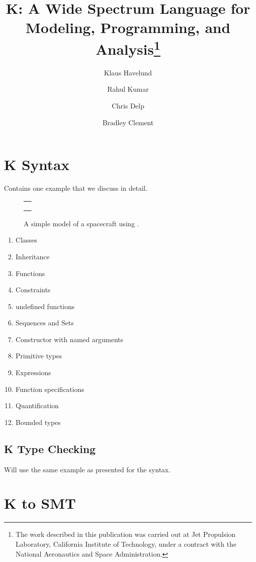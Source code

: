 \documentclass{llncs}
\title{K: A Wide Spectrum Language for Modeling, Programming, and
  Analysis\thanks{ The work described in this publication was carried
    out at Jet Propulsion Laboratory, California Institute of
    Technology, under a contract with the National Aeronautics and
    Space Administration.}}
\author{
  Klaus Havelund 
  \and 
  Rahul Kumar 
  \and 
  Chris Delp
  \and
  Bradley Clement
}
\institute{ Jet Propulsion Laboratory\\ 
            California Institute of Technology\\ 
            California, USA }
\begin{document}
\maketitle





\section{K Syntax}

Contains one example that we discuss in detail. 

\begin{figure}
\centering
\begin{tabular}{c}
\hline \\
 \\ \\
\hline
\end{tabular}
\caption{A simple model of a spacecraft using \Klang{}.}
\label{fig:spacecraftSmt}
\end{figure}

\begin{enumerate}
\item Classes
\item Inheritance
\item Functions
\item Constraints
\item undefined functions
\item Sequences and Sets
\item Constructor with named arguments
\item Primitive types
\item Expressions
\item Function specifications
\item Quantification
\item Bounded types
\end{enumerate}

\subsection{K Type Checking}

Will use the same example as presented for the syntax.

\section{K to SMT}
\end{document}
